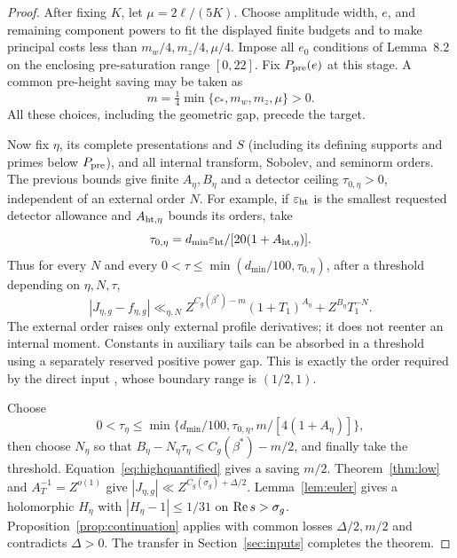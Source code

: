 \begin{proof}
After fixing $K$, let $\mu=2\ell/(5K)$. Choose amplitude width, $e$, and remaining component powers to fit the displayed finite budgets and to make principal costs less than $m_w/4,m_z/4,\mu/4$. Impose all $e_0$ conditions of Lemma~8.2 on the enclosing pre-saturation range $[0,22]$. Fix $P_{\rm pre}(e)$ at this stage. A common pre-height saving may be taken as
\[
 m=\tfrac14\min\{c_*,m_w,m_z,\mu\}>0.
\]
All these choices, including the geometric gap, precede the target.

Now fix $\eta$, its complete presentations and $S$ (including its defining supports and primes below $P_{\rm pre}$), and all internal transform, Sobolev, and seminorm orders. The previous bounds give finite $A_\eta,B_\eta$ and a detector ceiling $\tau_{0,\eta}>0$, independent of an external order $N$. For example, if $\varepsilon_{\rm ht}$ is the smallest requested detector allowance and $A_{{\rm ht},\eta}$ bounds its orders, take
\[
 \tau_{0,\eta}=d_{\min}\varepsilon_{\rm ht}/[20(1+A_{{\rm ht},\eta})].
\]
Thus for every $N$ and every $0<\tau\le\min(d_{\min}/100,\tau_{0,\eta})$, after a threshold depending on $\eta,N,\tau$,
\begin{equation}\label{eq:highquantified}
 |J_{\eta,g}-f_{\eta,g}|\ll_{\eta,N}
 Z^{C_g(\beta^*)-m}(1+T_1)^{A_\eta}+Z^{B_\eta}T_1^{-N}.
\end{equation}
The external order raises only external profile derivatives; it does not reenter an internal moment. Constants in auxiliary tails can be absorbed in a threshold using a separately reserved positive power gap. This is exactly the order required by the direct input , whose boundary range is $(1/2,1)$.

Choose
\[
 0<\tau_\eta\le\min\{d_{\min}/100,\tau_{0,\eta},m/[4(1+A_\eta)]\},
\]
then choose $N_\eta$ so that $B_\eta-N_\eta\tau_\eta<C_g(\beta^*)-m/2$, and finally take the threshold. Equation~\eqref{eq:highquantified} gives a saving $m/2$. Theorem~\ref{thm:low} and $A_T^{-1}=Z^{o(1)}$ give $|J_{\eta,g}|\ll Z^{C_g(\sigma_g)+\Delta/2}$. Lemma~\ref{lem:euler} gives a holomorphic $H_\eta$ with $|H_\eta-1|\le1/31$ on $\operatorname{Re} s>\sigma_g$. Proposition~\ref{prop:continuation} applies with common losses $\Delta/2,m/2$ and contradicts $\Delta>0$. The transfer in Section~\ref{sec:inputs} completes the theorem.
\end{proof}


